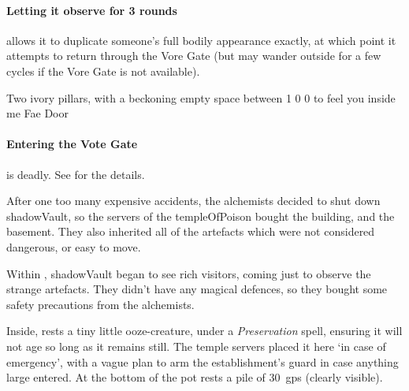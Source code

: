 \begin{multicols}{2}
\setcounter{statDots}{0}
\mphlg

\paragraph{Letting it observe for 3 rounds}
allows it to duplicate someone's full bodily appearance exactly, at which point it attempts to return through the Vore Gate (but may wander outside for a few \glspl{cycle} if the Vore Gate is not available).


  {Two ivory pillars, with a beckoning empty space between}%
  {1}%
  {0}%
  {0}%
  {to feel you inside me}%
  {Fae Door}%
  {
    \setcounter{Fire}{3}
    \setcounter{Earth}{2}
    \setcounter{Fate}{1}
    \setcounter{Water}{1}
    \setcounter{Academics}{2}
    \setcounter{Cultivation}{1}
  }%

\showStdSpells[
  \setcounter{diceNo}{0}
]

\paragraph{Entering the Vote Gate}
is deadly.
See  for the details.


\begin{exampletext}
  After one too many expensive accidents, the alchemists decided to shut down \gls{shadowVault}, so the \glspl{server} of the \gls{templeOfPoison} bought the building, and the basement.
  They also inherited all of the \glspl{artefact} which were not considered dangerous, or easy to move.

  Within , \gls{shadowVault} began to see rich visitors, coming just to observe the strange \glspl{artefact}.
  They didn't have any magical defences, so they bought some safety precautions from the alchemists.
\end{exampletext}

Inside, rests a tiny little ooze-creature, under a \textit{Preservation} spell, ensuring it will not age so long as it remains still.
The temple \glspl{server} placed it here `in case of emergency', with a vague plan to arm the establishment's guard in case anything large entered.
At the bottom of the pot rests a pile of 30~\glspl{gp} (clearly visible).


\end{multicols}

